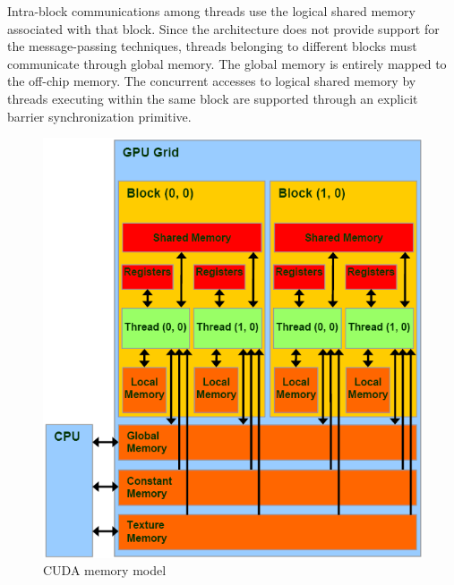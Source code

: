 Intra-block communications among threads use the logical shared memory associated with that block.\newline
   Since the architecture does not provide support for the message-passing techniques, threads belonging
to different blocks must communicate through global memory. The global memory is entirely mapped to the off-chip memory.
The concurrent accesses to logical shared memory by threads executing within the same block are supported through an explicit
barrier synchronization primitive.\newline

\begin{figure}[h!tp]
    \centering
     \includegraphics[width=1\textwidth]{./img/memModel}
\caption{CUDA memory model}\label{fig:memModel}
    \end{figure}

